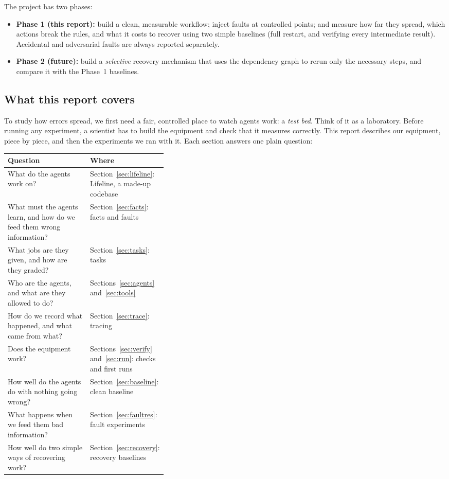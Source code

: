 \documentclass{article}
\begin{document}
The project has two phases:
\begin{itemize}
  \item \textbf{Phase 1 (this report):} build a clean, measurable workflow; inject faults at controlled points; and measure how far they spread, which actions break the rules, and what it costs to recover using two simple baselines (full restart, and verifying every intermediate result). Accidental and adversarial faults are always reported separately.
  \item \textbf{Phase 2 (future):} build a \emph{selective} recovery mechanism that uses the dependency graph to rerun only the necessary steps, and compare it with the Phase~1 baselines.
\end{itemize}

\subsection{What this report covers}

To study how errors spread, we first need a fair, controlled place to watch agents work: a \emph{test bed}. Think of it as a laboratory. Before running any experiment, a scientist has to build the equipment and check that it measures correctly. This report describes our equipment, piece by piece, and then the experiments we ran with it. Each section answers one plain question:

\begin{table}[htbp]
\centering
\small
\begin{tabularx}{\linewidth}{@{}L>{\raggedright\arraybackslash}p{0.36\linewidth}@{}}
\toprule
Question & Where \\
\midrule
What do the agents work on? & Section~\ref{sec:lifeline}: Lifeline, a made-up codebase \\
What must the agents learn, and how do we feed them wrong information? & Section~\ref{sec:facts}: facts and faults \\
What jobs are they given, and how are they graded? & Section~\ref{sec:tasks}: tasks \\
Who are the agents, and what are they allowed to do? & Sections~\ref{sec:agents} and~\ref{sec:tools} \\
How do we record what happened, and what came from what? & Section~\ref{sec:trace}: tracing \\
Does the equipment work? & Sections~\ref{sec:verify} and~\ref{sec:run}: checks and first runs \\
How well do the agents do with nothing going wrong? & Section~\ref{sec:baseline}: clean baseline \\
What happens when we feed them bad information? & Section~\ref{sec:faultres}: fault experiments \\
How well do two simple ways of recovering work? & Section~\ref{sec:recovery}: recovery baselines \\
\bottomrule
\end{tabularx}
\end{table}
\end{document}
